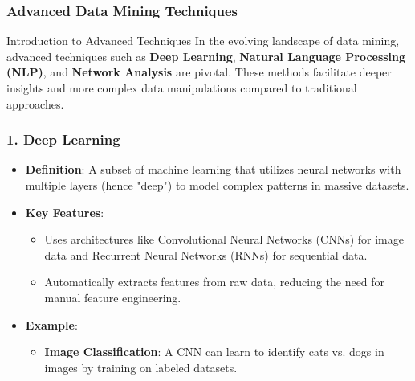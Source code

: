 \documentclass{beamer}
\begin{document}
\begin{frame}[fragile]
    \frametitle{Advanced Data Mining Techniques}
    \begin{block}{Introduction to Advanced Techniques}
        In the evolving landscape of data mining, advanced techniques such as \textbf{Deep Learning}, \textbf{Natural Language Processing (NLP)}, and \textbf{Network Analysis} are pivotal. These methods facilitate deeper insights and more complex data manipulations compared to traditional approaches.
    \end{block}
\end{frame}

\begin{frame}[fragile]
    \frametitle{1. Deep Learning}
    \begin{itemize}
        \item \textbf{Definition}: A subset of machine learning that utilizes neural networks with multiple layers (hence "deep") to model complex patterns in massive datasets.
        \item \textbf{Key Features}:
            \begin{itemize}
                \item Uses architectures like Convolutional Neural Networks (CNNs) for image data and Recurrent Neural Networks (RNNs) for sequential data.
                \item Automatically extracts features from raw data, reducing the need for manual feature engineering.
            \end{itemize}
        \item \textbf{Example}:
            \begin{itemize}
                \item \textbf{Image Classification}: A CNN can learn to identify cats vs. dogs in images by training on labeled datasets.
            \end{itemize}
    \end{itemize}
\end{frame}
\end{document}
